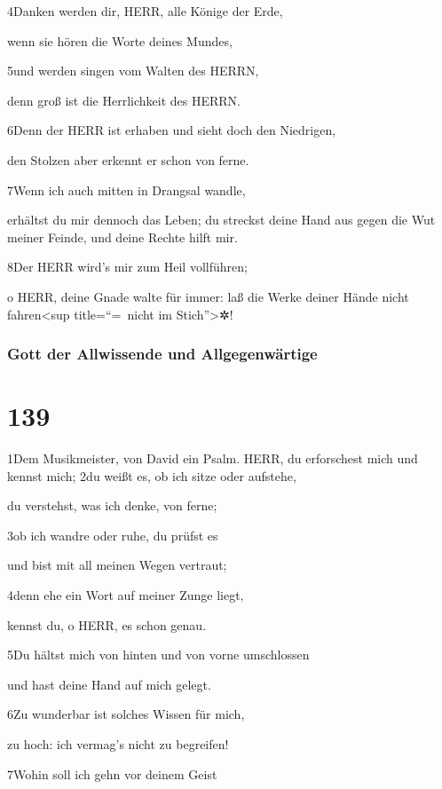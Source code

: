 4Danken werden dir, HERR, alle Könige der Erde,

wenn sie hören die Worte deines Mundes,

5und werden singen vom Walten des HERRN,

denn groß ist die Herrlichkeit des HERRN.

6Denn der HERR ist erhaben und sieht doch den Niedrigen,

den Stolzen aber erkennt er schon von ferne.

7Wenn ich auch mitten in Drangsal wandle,

erhältst du mir dennoch das Leben; du streckst deine Hand aus gegen die
Wut meiner Feinde, und deine Rechte hilft mir.

8Der HERR wird's mir zum Heil vollführen;

o HERR, deine Gnade walte für immer: laß die Werke deiner Hände nicht
fahren\textless sup title=``=~nicht im Stich''\textgreater✲!

\hypertarget{gott-der-allwissende-und-allgegenwuxe4rtige}{%
\subsubsection{Gott der Allwissende und
Allgegenwärtige}\label{gott-der-allwissende-und-allgegenwuxe4rtige}}

\hypertarget{section-138}{%
\section{139}\label{section-138}}

1Dem Musikmeister, von David ein Psalm. HERR, du erforschest mich und
kennst mich; 2du weißt es, ob ich sitze oder aufstehe,

du verstehst, was ich denke, von ferne;

3ob ich wandre oder ruhe, du prüfst es

und bist mit all meinen Wegen vertraut;

4denn ehe ein Wort auf meiner Zunge liegt,

kennst du, o HERR, es schon genau.

5Du hältst mich von hinten und von vorne umschlossen

und hast deine Hand auf mich gelegt.

6Zu wunderbar ist solches Wissen für mich,

zu hoch: ich vermag's nicht zu begreifen!

7Wohin soll ich gehn vor deinem Geist

